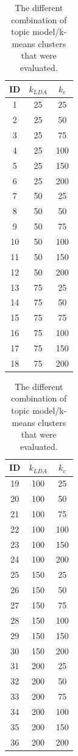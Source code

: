 \begin{table}[!ht]
    \centering
    \begin{tabular}{|ccc|}
        \hline
        ID & $k_{LDA}$ & $k_{c}$\\
        \hline
        1 & 25 & 25 \\
        2 & 25 & 50 \\
        3 & 25 & 75 \\
        4 & 25 & 100 \\
        5 & 25 & 150 \\
        6 & 25 & 200 \\
        7 & 50 & 25 \\
        8 & 50 & 50 \\
        9 & 50 & 75 \\
        10 & 50 & 100 \\
        11 & 50 & 150 \\
        12 & 50 & 200 \\
        13 & 75 & 25 \\
        14 & 75 & 50 \\
        15 & 75 & 75 \\
        16 & 75 & 100 \\
        17 & 75 & 150 \\
        18 & 75 & 200 \\
        \hline
    \end{tabular}
    \quad
    \begin{tabular}{|ccc|}
        \hline
        ID & $k_{LDA}$ & $k_{c}$\\
        \hline
        19 & 100 & 25 \\
        20 & 100 & 50 \\
        21 & 100 & 75 \\
        22 & 100 & 100 \\
        23 & 100 & 150 \\
        24 & 100 & 200 \\
        25 & 150 & 25 \\
        26 & 150 & 50 \\
        27 & 150 & 75 \\
        28 & 150 & 100 \\
        29 & 150 & 150 \\
        30 & 150 & 200 \\
        31 & 200 & 25 \\
        32 & 200 & 50 \\
        33 & 200 & 75 \\
        34 & 200 & 100 \\
        35 & 200 & 150 \\
        36 & 200 & 200 \\
        \hline
    \end{tabular}
    \caption{The different combination of topic model/k-means clusters that were evaluated.}
    \label{tab:topic-kmeans-configs}
\end{table}

